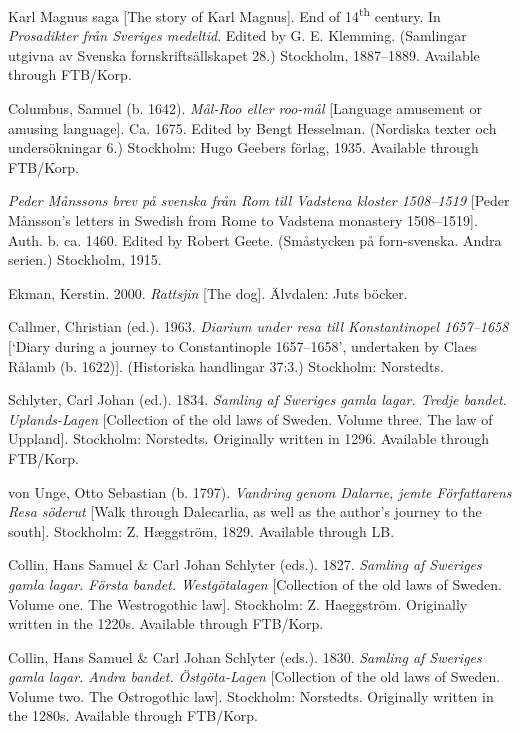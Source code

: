 \documentclass[output=paper]{langscibook}
\begin{document}
\begin{description}[font=\normalfont]
\item[KM:] Karl Magnus saga [The story of Karl Magnus]. End of 14\textsuperscript{th} century. In \textit{Prosadikter från Sveriges medeltid}. Edited by G. E. Klemming. (Samlingar utgivna av Svenska fornskriftsällskapet 28.) Stockholm, 1887–1889. Available through FTB\slash Korp.
\item[Mål-roo:] Columbus, Samuel (b. 1642). \textit{Mål-Roo eller roo-mål} [Language amusement or amusing language]. Ca. 1675. Edited by Bengt Hesselman. (Nordiska texter och undersökningar 6.) Stockholm: Hugo Geebers förlag, 1935. Available through FTB\slash Korp.
\item[Måns:] \textit{Peder Månssons brev på svenska från Rom till Vadstena kloster 1508–1519} [Peder Månsson’s letters in Swedish from Rome to Vadstena monastery 1508–1519]. Auth. b. ca. 1460. Edited by Robert Geete. (Småstycken på forn-svenska. Andra serien.) Stockholm, 1915.
\item[Rattsjin:] Ekman, Kerstin. 2000. \textit{Rattsjin} [The dog]. Älvdalen: Juts böcker. 
\item[Rålamb:] Callmer, Christian (ed.). 1963. \textit{Diarium under resa till Konstantinopel 1657–1658} [`Diary during a journey to Constantinople 1657–1658’, undertaken by Claes Rålamb (b. 1622)]. (Historiska handlingar 37:3.) Stockholm: Norstedts.
\item[UL:] Schlyter, Carl Johan (ed.). 1834. \emph{Samling af Sweriges gamla lagar. Tredje bandet.} \textit{Uplands-Lagen} [Collection of the old laws of Sweden. Volume three. The law of Uppland]. Stockholm: Norstedts. Originally written in 1296. Available through FTB\slash Korp.
\item[von Unge:] von Unge, Otto Sebastian (b. 1797). \textit{Vandring genom Dalarne, jemte Författarens Resa söderut} [Walk through Dalecarlia, as well as the author’s journey to the south]. Stockholm: Z. Hæggström, 1829. Available through LB.
\item[EWL:] Collin, Hans Samuel \& Carl Johan Schlyter (eds.). 1827. \emph{Samling af Sweriges gamla lagar. Första bandet. Westgötalagen} [Collection of the old laws of Sweden. Volume one. The Westrogothic law]. Stockholm: Z. Haeggström. Originally written in the 1220s. Available through FTB\slash Korp.
\item[ÖgL:] Collin, Hans Samuel \& Carl Johan Schlyter (eds.). 1830. \emph{Samling af Sweriges gamla lagar. Andra bandet.} \textit{Östgöta-Lagen} [Collection of the old laws of Sweden. Volume two. The Ostrogothic law]. Stockholm: Norstedts. Originally written in the 1280s. Available through FTB\slash Korp.
\end{description}
\end{document}
